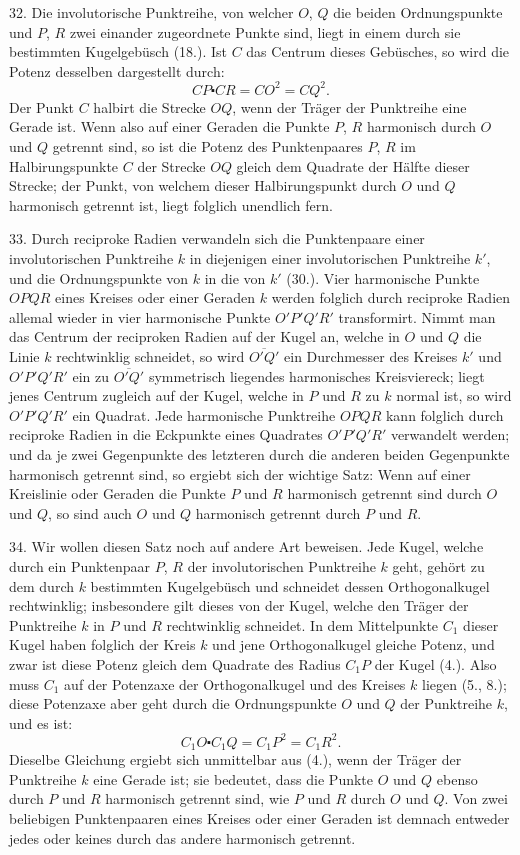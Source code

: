 32. Die involutorische Punktreihe, von welcher $O$, $Q$
die beiden Ordnungspunkte und $P$, $R$ zwei einander zugeordnete
Punkte sind, liegt in einem durch sie bestimmten
Kugelgeb\"usch (18.). Ist $C$ das Centrum dieses Geb\"usches,
so wird die Potenz desselben dargestellt durch:
\[
CP \centerdot CR = CO^2 = CQ^2 .
\]
Der Punkt $C$ halbirt die Strecke $OQ$, wenn der Tr\"ager der
Punktreihe eine Gerade ist. Wenn also auf einer Geraden
die Punkte $P$, $R$ harmonisch durch $O$ und $Q$ getrennt sind,
so ist die Potenz des Punktenpaares $P$, $R$ im Halbirungspunkte
$C$ der Strecke $OQ$ gleich dem Quadrate der H\"alfte
dieser Strecke; der Punkt, von welchem dieser Halbirungspunkt
durch $O$ und $Q$ harmonisch getrennt ist, liegt folglich
unendlich fern.

33. Durch reciproke Radien verwandeln sich die Punktenpaare
einer involutorischen Punktreihe $k$ in diejenigen
einer involutorischen Punktreihe $k'$, und die Ordnungspunkte
von $k$ in die von $k'$ (30.). Vier harmonische Punkte $OPQR$
eines Kreises oder einer Geraden $k$ werden folglich durch
reciproke Radien allemal wieder in vier harmonische Punkte
$O'P'Q'R'$ transformirt. Nimmt man das Centrum der reciproken
Radien auf der Kugel an, welche in $O$ und $Q$ die
Linie $k$ rechtwinklig schneidet, so wird $\overline{O'Q'}$ ein Durchmesser
des Kreises $k'$ und $O'P'Q'R'$ ein zu $\overline{O'Q'}$ symmetrisch liegendes
harmonisches Kreisviereck; liegt jenes Centrum zugleich
auf der Kugel, welche in $P$ und $R$ zu $k$ normal ist,
so wird $O'P'Q'R'$ ein Quadrat. Jede harmonische Punktreihe
$OPQR$ kann folglich durch reciproke Radien in die
Eckpunkte eines Quadrates $O'P'Q'R'$ verwandelt werden;
und da je zwei Gegenpunkte des letzteren durch die anderen
beiden Gegenpunkte harmonisch getrennt sind, so ergiebt
sich der wichtige Satz: Wenn auf einer Kreislinie oder Geraden
die Punkte $P$ und $R$ harmonisch getrennt sind durch
$O$ und $Q$, so sind auch $O$ und $Q$ harmonisch getrennt durch
$P$ und $R$.

34. Wir wollen diesen Satz noch auf andere Art beweisen.
Jede Kugel, welche durch ein Punktenpaar $P$, $R$
der involutorischen Punktreihe $k$ geht, geh\"ort zu dem durch
$k$ bestimmten Kugelgeb\"usch und schneidet dessen Orthogonalkugel
rechtwinklig; insbesondere gilt dieses von der Kugel,
welche den Tr\"ager der Punktreihe $k$ in $P$ und $R$ rechtwinklig
schneidet. In dem Mittelpunkte $C_1$ dieser Kugel
haben folglich der Kreis $k$ und jene Orthogonalkugel gleiche
Potenz, und zwar ist diese Potenz gleich dem Quadrate des
Radius $C_1 P$ der Kugel (4.). Also muss $C_1$ auf der Potenzaxe
der Orthogonalkugel und des Kreises $k$ liegen (5., 8.);
diese Potenzaxe aber geht durch die Ordnungspunkte $O$ und
$Q$ der Punktreihe $k$, und es ist:
\[
C_1 O \centerdot C_1 Q = C_1 P^2 = C_1 R^2.
\]
Dieselbe Gleichung ergiebt sich unmittelbar aus (4.), wenn
der Tr\"ager der Punktreihe $k$ eine Gerade ist; sie bedeutet,
dass die Punkte $O$ und $Q$ ebenso durch $P$ und $R$ harmonisch
getrennt sind, wie $P$ und $R$ durch $O$ und $Q$. Von zwei beliebigen
Punktenpaaren eines Kreises oder einer Geraden ist
demnach entweder jedes oder keines durch das andere harmonisch
getrennt.

